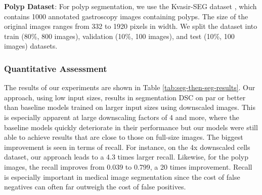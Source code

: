 \textbf{Polyp Dataset}: For polyp segmentation, we use the Kvasir-SEG dataset \cite{jha2020kvasir}, which contains 1000 annotated gastroscopy images containing polyps. The size of the original images ranges from 332 to 1920 pixels in width. We split the dataset into train (80\%, 800 images), validation (10\%, 100 images), and test (10\%, 100 images) datasets.

\subsubsection{Quantitative Assessment}

The results of our experiments are shown in Table \ref{tab:seg-then-seg-results}. Our approach, using low input sizes, results in segmentation DSC on par or better than baseline models trained on larger input sizes using downscaled images. This is especially apparent at large downscaling factors of 4 and more, where the baseline models quickly deteriorate in their performance but our models were still able to achieve results that are close to those on full-size images. The biggest improvement is seen in terms of recall. For instance, on the 4x downscaled cells dataset, our approach leads to a 4.3 times larger recall. Likewise, for the polyp images, the recall improves from 0.039 to 0.799, a 20 times improvement. Recall is especially important in medical image segmentation since the cost of false negatives can often far outweigh the cost of false positives.

